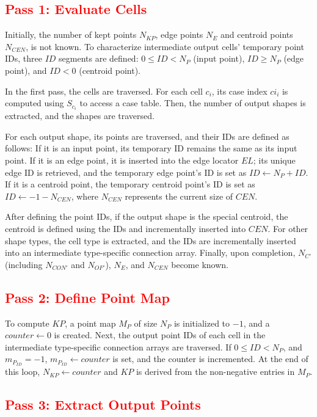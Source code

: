 \documentclass{egpubl}
\newcommand*{\fix}[1]{\textcolor{red}{#1}}
\begin{document}
\subsection{\fix{Pass 1: Evaluate Cells}}

Initially, the number of kept points $N_{KP}$, edge points $N_E$ and centroid points $N_{CEN}$, is not known. To characterize intermediate output cells' temporary point IDs, three $ID$ segments are defined:  $0 \leq ID < N_P$ (input point), $ID \geq N_P$ (edge point), and $ID < 0$ (centroid point).

In the first pass, the cells are traversed. For each cell $c_i$, its case index $ci_i$ is computed using $S_{c_i}$ to access a case table. Then, the number of output shapes is extracted, and the shapes are traversed.

For each output shape, its points are traversed, and their IDs are defined as follows: If it is an input point, its temporary ID remains the same as its input point. If it is an edge point, it is inserted into the edge locator $EL$; its unique edge ID is retrieved, and the temporary edge point's ID is set as $ID \gets N_{P} + ID$. If it is a centroid point, the temporary centroid point's ID is set as $ID \gets -1 - N_{CEN}$, where $N_{CEN}$ represents the current size of $CEN$.

After defining the point IDs, if the output shape is the special centroid, the centroid is defined using the IDs and incrementally inserted into $CEN$. For other shape types, the cell type is extracted, and the IDs are incrementally inserted into an intermediate type-specific connection array. Finally, upon completion, $N_{C'}$ (including $N_{CON'}$ and $N_{OF'}$), $N_E$, and $N_{CEN}$ become known.

\subsection{\fix{Pass 2: Define Point Map}}

To compute $KP$, a point map $M_P$ of size $N_P$ is initialized to $-1$, and a $counter \gets 0$ is created. Next, the output point IDs of each cell in the intermediate type-specific connection arrays are traversed. If $0 \leq \textit{ID} < N_P$, and $m_{P_{ID}} = -1$, $m_{P_{ID}} \gets counter$ is set, and the counter is incremented. At the end of this loop, $N_{KP} \gets counter$ and $KP$ is derived
from the non-negative entries in $M_P$.

\subsection{\fix{Pass 3: Extract Output Points}}
\end{document}
